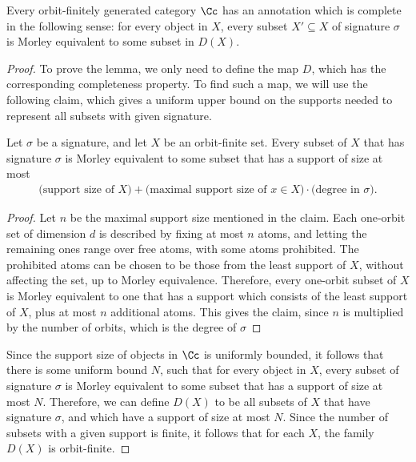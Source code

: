 \begin{lemma}\label{lem:complete-annotation-exists}
    Every orbit-finitely generated category $\Cc$ has  an  annotation which is complete in the following sense: for every object in $X$, every subset $X' \subseteq X$ of signature $\sigma$ is Morley equivalent to some subset in $D(X)$.
\end{lemma}
\begin{proof}
    To prove the lemma, we only need to define the map $D$, which has the corresponding completeness property. To find such a map, we will use the following claim, which gives a uniform upper bound on the supports needed to represent all subsets with given signature.

    \begin{claim}\label{claim:bound-on-support-size-for-representatives}
        Let $\sigma$ be a signature, and let $X$ be an orbit-finite set. Every subset of $X$ that has signature $\sigma$ is Morley equivalent to some subset that has a support of size at most
        \begin{align*}
        \text{(support size of $X$)} + \text{(maximal support size of $x \in X$)} \cdot \text{(degree in $\sigma$)}.
        \end{align*} 
    \end{claim}
\begin{proof}
    Let $n$ be the maximal support size mentioned in the claim.
    Each one-orbit set of dimension $d$ is described by fixing at most $n$ atoms, and letting the remaining ones range over free atoms, with some atoms prohibited. The  prohibited  atoms can be chosen to be those from the least support of $X$, without affecting the set, up to Morley equivalence. Therefore, every one-orbit subset of $X$ is  Morley equivalent to one that has a support which consists of the least support of $X$, plus at most $n$ additional atoms. This gives the claim, since $n$ is multiplied by the number of orbits, which is the degree of $\sigma$
\end{proof}
    Since the support size of objects in $\Cc$ is uniformly bounded, it follows that there is some uniform bound $N$, such that for every object in $X$, every subset of signature $\sigma$ is Morley equivalent to some subset that has a support of size at most $N$. Therefore, we can define $D(X)$ to be all subsets of $X$ that have signature $\sigma$, and which have a support of size at most $N$. Since the number of subsets with a given support is finite, it follows that for each $X$, the family $D(X)$ is orbit-finite. 
\end{proof}

